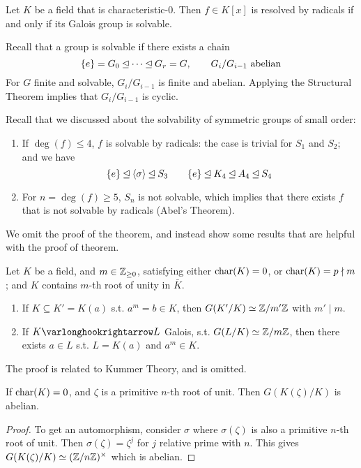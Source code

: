 \documentclass{article}
\begin{document}
\begin{theorem}\label{thm: solvable by radicals iff galois group is solvable}
    Let $K$ be a field that is characteristic-0. Then $f \in K[x]$ is resolved by radicals if and only if its Galois group is solvable. 
\end{theorem}

\textstart
Recall that a group is solvable if there exists a chain
\[
    \{e\} = G_0 \unlhd \cdots \unlhd G_r = G, \qquad \text{$G_i/G_{i-1}$ abelian}
\]
For $G$ finite and solvable, $G_i/G_{i-1}$ is finite and abelian. Applying the Structural Theorem implies that $G_i/G_{i-1}$ is cyclic. 

\begin{example}
    Recall that we discussed about the solvability of symmetric groups of small order:
    \begin{enumerate}
        \item If $\deg (f) \leq 4$, $f$ is solvable by radicals: the case is trivial for $S_1$ and $S_2$; and we have
        \[
            \{e\} \unlhd \left\langle \sigma \right\rangle \unlhd S_3 \qquad \{e\} \unlhd K_4 \unlhd A_4 \unlhd S_4
        \]
        \item For $n = \deg(f) \geq 5$, $S_n$ is not solvable, which implies that there exists $f$ that is not solvable by radicals (Abel's Theorem).
    \end{enumerate}
\end{example}

\textstart
We omit the proof of the theorem, and instead show some results that are helpful with the proof of theorem.
\begin{proposition}
    Let $K$ be a field, and $m \in \mathbb{Z}_{\geq 0}$, satisfying either $\mathrm{char}(K) = 0$, or $\mathrm{char}(K) = p \nmid m$; and $K$ contains $m$-th root of unity in $\bar{K}$.
    \begin{enumerate}[label=\arabic*)]
        \item If $K \subseteq K' = K(a)$ s.t. $a^m = b \in K$, then $G(K'/K) \simeq \mathbb{Z}/m'\mathbb{Z}$ with $m' \mid m$.
        \item If $K \ext L$ Galois, s.t. $G(L/K) \simeq \mathbb{Z}/m\mathbb{Z}$, then there exists $a \in L$ s.t. $L = K(a)$ and $a^m \in K$.
    \end{enumerate}
\end{proposition}

\textstart
The proof is related to Kummer Theory, and is omitted.

\begin{lemma}
    If $\mathrm{char}(K) = 0$, and $\zeta$ is a primitive $n$-th root of unit. Then $G(K(\zeta)/K)$ is abelian.
\end{lemma}
\begin{proof}
    To get an automorphism, consider $\sigma$ where $\sigma(\zeta)$ is also a primitive $n$-th root of unit. Then $\sigma(\zeta) = \zeta^j$ for $j$ relative prime with $n$. This gives $G(K(\zeta)/K) \simeq (\mathbb{Z}/n\mathbb{Z})^{\times}$ which is abelian.
\end{proof}
\end{document}

